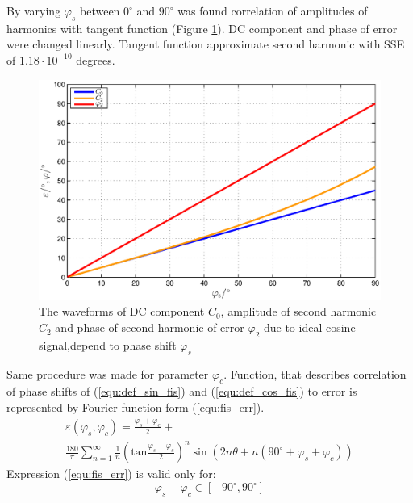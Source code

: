 \documentclass[a4paper]{article}
\begin{document}
By varying $\varphi_s$ between $0^\circ$ and $90^\circ$ was found correlation of amplitudes of harmonics with tangent function (Figure \ref{fig:fis}). DC component and phase of error were changed linearly. Tangent function approximate second harmonic with SSE of $1.18 \cdot 10^{-10}$ degrees.
\begin{figure}[!htb]
	\begin{center}
		\includegraphics[width=\linewidth]{./Slike/fis.eps}
		\caption{The waveforms of DC component $C_0$, amplitude of second harmonic  $C_2$ and phase of second harmonic of  error $\varphi_2$ due to ideal cosine signal,depend to phase shift $\varphi_{s}$} \label{fig:fis}
	\end{center}
\end{figure}

Same procedure was made for parameter $\varphi_c$. Function, that describes correlation of phase shifts of (\ref{equ:def_sin_fis}) and (\ref{equ:def_cos_fis}) to error is represented by Fourier function form (\ref{equ:fis_err}).
\begin{multline}
\label{equ:fis_err}
\varepsilon(\varphi_{s},\varphi_{c}) = \frac{\varphi_{s}+\varphi_{c}}{2}+\\ \frac{180}{\pi}\sum_{n=1}^{\infty}\frac{1}{n} (\mathrm{tan}\frac{\varphi_{s}-\varphi_{c}}{2})^n \sin (2n \theta+n(90^\circ +\varphi_{s}+\varphi_{c}))
\end{multline}
Expression (\ref{equ:fis_err}) is valid only for:
$$ \varphi_{s}-\varphi_{c} \in [ -90^\circ , 90^\circ ] $$
\end{document}
